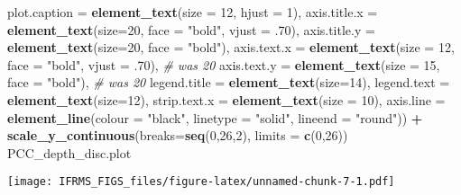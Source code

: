 \documentclass[
]{article}
\newenvironment{Shaded}{\begin{snugshade}}{\end{snugshade}}
\newcommand{\CommentTok}[1]{\textcolor[rgb]{0.56,0.35,0.01}{\textit{#1}}}
\newcommand{\DataTypeTok}[1]{\textcolor[rgb]{0.13,0.29,0.53}{#1}}
\newcommand{\DecValTok}[1]{\textcolor[rgb]{0.00,0.00,0.81}{#1}}
\newcommand{\FloatTok}[1]{\textcolor[rgb]{0.00,0.00,0.81}{#1}}
\newcommand{\KeywordTok}[1]{\textcolor[rgb]{0.13,0.29,0.53}{\textbf{#1}}}
\newcommand{\NormalTok}[1]{#1}
\newcommand{\OperatorTok}[1]{\textcolor[rgb]{0.81,0.36,0.00}{\textbf{#1}}}
\newcommand{\StringTok}[1]{\textcolor[rgb]{0.31,0.60,0.02}{#1}}
\begin{document}
\begin{Shaded}
\begin{Highlighting}[]
        \DataTypeTok{plot.caption =} \KeywordTok{element_text}\NormalTok{(}\DataTypeTok{size =} \DecValTok{12}\NormalTok{, }\DataTypeTok{hjust =} \DecValTok{1}\NormalTok{),}
        \DataTypeTok{axis.title.x =} \KeywordTok{element_text}\NormalTok{(}\DataTypeTok{size=}\DecValTok{20}\NormalTok{, }\DataTypeTok{face =} \StringTok{"bold"}\NormalTok{, }\DataTypeTok{vjust =} \FloatTok{.70}\NormalTok{),}
        \DataTypeTok{axis.title.y =} \KeywordTok{element_text}\NormalTok{(}\DataTypeTok{size=}\DecValTok{20}\NormalTok{, }\DataTypeTok{face =} \StringTok{"bold"}\NormalTok{),}
        \DataTypeTok{axis.text.x =} \KeywordTok{element_text}\NormalTok{(}\DataTypeTok{size =} \DecValTok{12}\NormalTok{, }\DataTypeTok{face =} \StringTok{"bold"}\NormalTok{, }\DataTypeTok{vjust =} \FloatTok{.70}\NormalTok{), }\CommentTok{# was 20}
        \DataTypeTok{axis.text.y =} \KeywordTok{element_text}\NormalTok{(}\DataTypeTok{size =} \DecValTok{15}\NormalTok{, }\DataTypeTok{face =} \StringTok{"bold"}\NormalTok{), }\CommentTok{# was 20}
        \DataTypeTok{legend.title =} \KeywordTok{element_text}\NormalTok{(}\DataTypeTok{size=}\DecValTok{14}\NormalTok{), }
        \DataTypeTok{legend.text =} \KeywordTok{element_text}\NormalTok{(}\DataTypeTok{size=}\DecValTok{12}\NormalTok{),}
        \DataTypeTok{strip.text.x =} \KeywordTok{element_text}\NormalTok{(}\DataTypeTok{size =} \DecValTok{10}\NormalTok{),}
        \DataTypeTok{axis.line =} \KeywordTok{element_line}\NormalTok{(}\DataTypeTok{colour =} \StringTok{"black"}\NormalTok{, }\DataTypeTok{linetype =} \StringTok{"solid"}\NormalTok{, }\DataTypeTok{lineend =} \StringTok{"round"}\NormalTok{)) }\OperatorTok{+}
\StringTok{  }\KeywordTok{scale_y_continuous}\NormalTok{(}\DataTypeTok{breaks=}\KeywordTok{seq}\NormalTok{(}\DecValTok{0}\NormalTok{,}\DecValTok{26}\NormalTok{,}\DecValTok{2}\NormalTok{), }\DataTypeTok{limits =} \KeywordTok{c}\NormalTok{(}\DecValTok{0}\NormalTok{,}\DecValTok{26}\NormalTok{))}
\NormalTok{PCC_depth_disc.plot}
\end{Highlighting}
\end{Shaded}

\texttt{[image: IFRMS\_FIGS\_files/figure-latex/unnamed-chunk-7-1.pdf]}
\end{document}
